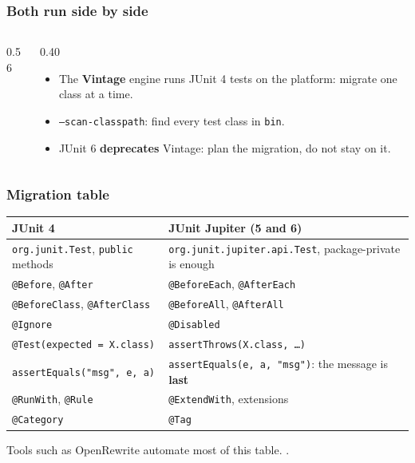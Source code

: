 \documentclass[aspectratio=169,10pt,compress]{beamer}
\begin{document}
\begin{frame}[t,fragile] \frametitle{Both run side by side}
  \begin{columns}[T]
    \begin{column}{0.56\textwidth}
    \end{column}
    \begin{column}{0.40\textwidth}
      \begin{itemize}\small
        \item The \textbf{Vintage} engine runs JUnit 4 tests on the platform: migrate one class at a time.
        \item \texttt{--scan-classpath}: find every test class in \texttt{bin}.
        \item JUnit 6 \textbf{deprecates} Vintage: plan the migration, do not stay on it.
      \end{itemize}
    \end{column}
  \end{columns}
\end{frame}




\begin{frame}[t,fragile] \frametitle{Migration table}
  \begin{center}\footnotesize
  \begin{tabular}{@{}ll@{}}
    \toprule
    \textbf{JUnit 4}                                  & \textbf{JUnit Jupiter (5 and 6)} \\
    \midrule
    \texttt{org.junit.Test}, \texttt{public} methods  & \texttt{org.junit.jupiter.api.Test}, package-private is enough \\
    \texttt{@Before}, \texttt{@After}                 & \texttt{@BeforeEach}, \texttt{@AfterEach} \\
    \texttt{@BeforeClass}, \texttt{@AfterClass}       & \texttt{@BeforeAll}, \texttt{@AfterAll} \\
    \texttt{@Ignore}                                  & \texttt{@Disabled} \\
    \texttt{@Test(expected = X.class)}                & \texttt{assertThrows(X.class, \dots)} \\
    \texttt{assertEquals("msg", e, a)}                & \texttt{assertEquals(e, a, "msg")}: the message is \textbf{last} \\
    \texttt{@RunWith}, \texttt{@Rule}                 & \texttt{@ExtendWith}, extensions \\
    \texttt{@Category}                                & \texttt{@Tag} \\
    \bottomrule
  \end{tabular}
  \end{center}
  \small Tools such as OpenRewrite automate most of this table. .
\end{frame}
\end{document}
